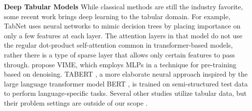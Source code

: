 \documentclass{article}
\newcommand{\avi}[1]{\textcolor{blue}{#1}}
\begin{document}

\textbf{Deep Tabular Models} While classical methods are still the industry favorite, some recent work brings deep learning to the tabular domain. For example, TabNet \cite{arik2019TabNet} uses neural networks to mimic decision trees by placing importance on only a few features at each layer. The attention layers in that model do not use the regular dot-product self-attention common in transformer-based models, rather there is a type of sparse layer that allows only certain features to pass through. \citet{yoon2020vime} propose VIME, which employs MLPs in a technique for pre-training based on denoising. TABERT \cite{yin2020tabert}, a more elaborate neural approach inspired by the large language transformer model BERT \cite{devlin2018bert}, is trained on semi-structured test data to perform language-specific tasks. Several other studies utilize tabular data, but their problem settings are outside of our scope \cite{pathak2016context,chen2019learning,padhi2021tabular,shavitt2018regularization, katzir2021netdnf}.
\end{document}
